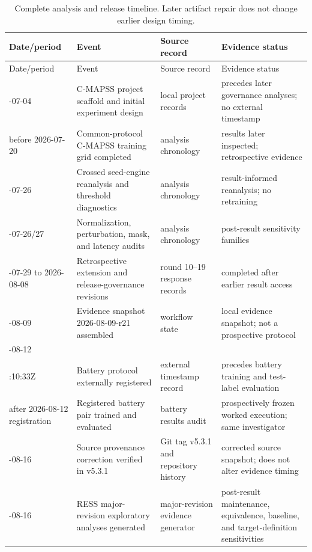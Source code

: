 \small
\begin{longtable}{@{}>{\raggedright\arraybackslash}p{}>{\raggedright\arraybackslash}p{}>{\raggedright\arraybackslash}p{}>{\raggedright\arraybackslash}p{}@{}}
\caption{Complete analysis and release timeline. Later artifact repair does not change earlier design timing.}\label{tab:analysis-timeline} \\
\toprule
Date/period & Event & Source record & Evidence status \\
\midrule
\endfirsthead
\toprule
Date/period & Event & Source record & Evidence status \\
\midrule
\endhead
2026-07-04 & C-MAPSS project scaffold and initial experiment design & local project records & precedes later governance analyses; no external timestamp \\
before 2026-07-20 & Common-protocol C-MAPSS training grid completed & analysis chronology & results later inspected; retrospective evidence \\
2026-07-26 & Crossed seed-engine reanalysis and threshold diagnostics & analysis chronology & result-informed reanalysis; no retraining \\
2026-07-26/27 & Normalization, perturbation, mask, and latency audits & analysis chronology & post-result sensitivity families \\
2026-07-29 to 2026-08-08 & Retrospective extension and release-governance revisions & round 10--19 response records & completed after earlier result access \\
2026-08-09 & Evidence snapshot 2026-08-09-r21 assembled & workflow state & local evidence snapshot; not a prospective protocol \\
2026-08-12\\09:10:33Z & Battery protocol externally registered & external timestamp record & precedes battery training and test-label evaluation \\
after 2026-08-12 registration & Registered battery pair trained and evaluated & battery results audit & prospectively frozen worked execution; same investigator \\
2026-08-16 & Source provenance correction verified in v5.3.1 & Git tag v5.3.1 and repository history & corrected source snapshot; does not alter evidence timing \\
2026-08-16 & RESS major-revision exploratory analyses generated & major-revision evidence generator & post-result maintenance, equivalence, baseline, and target-definition sensitivities \\

\end{longtable}
